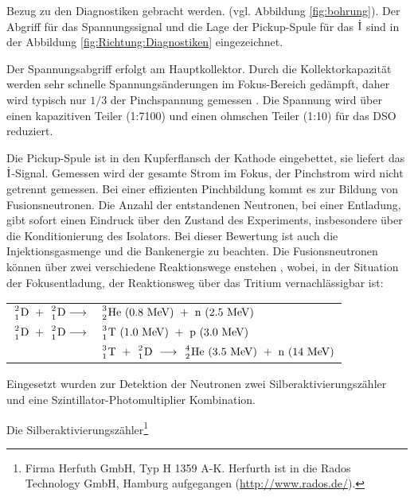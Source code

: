 Bezug zu den Diagnostiken gebracht werden. (vgl. Abbildung
\vref{fig:bohrung}).
%
%
Der Abgriff für das Spannungssignal und die Lage der Pickup-Spule für
das $\rm\dot{I}$ sind in der Abbildung \vref{fig:Richtung:Diagnostiken}
eingezeichnet.
\par
Der Spannungsabgriff erfolgt am Hauptkollektor. Durch die
Kollektorkapazität werden sehr schnelle Spannungsänderungen im
Fokus-Bereich gedämpft, daher wird typisch nur $1/3$ der Pinchspannung
gemessen \cite{stein:staat}. Die Spannung wird über einen kapazitiven
Teiler (1:7100) und einen ohmschen Teiler (1:10) für das DSO reduziert.
\par
Die Pickup-Spule ist in den Kupferflansch der Kathode eingebettet, sie
liefert das $\rm\dot{I}$-Signal. Gemessen wird der gesamte Strom im
Fokus, der Pinchstrom wird nicht getrennt gemessen.
%
\label{sec:neutronendiagnostik}
%
Bei einer effizienten Pinchbildung kommt es zur Bildung von
Fusionsneutronen. Die Anzahl der entstandenen Neutronen, bei einer
Entladung, gibt sofort einen Eindruck über den Zustand des Experiments,
insbesondere über die Konditionierung des Isolators. Bei dieser
Bewertung ist auch die Injektionsgasmenge und die Bankenergie zu
beachten. Die Fusionsneutronen können über zwei verschiedene
Reaktionswege enstehen \cite{dtv:70}, wobei, in der Situation der
Fokusentladung, der Reaktionsweg über das Tritium vernachlässigbar ist:
\par
\begin{tabular}{rl}
  ${2 \atop 1}{\rm D} \ +\ {2 \atop 1}{\rm D} \longrightarrow
  $&${3 \atop 2}{\rm He}\ (0.8 {\rm\ MeV}) \ +\ \rm n\ (2.5 {\rm\ MeV}) $\\[1.5mm]

  ${2 \atop 1}{\rm D} \ +\ {2 \atop 1}{\rm D} \longrightarrow
  $&${3 \atop 1}{\rm T}\ (1.0 {\rm\ MeV}) \ +\ \rm p\ (3.0 {\rm\ MeV}) $\\[1.5mm]

  &${3 \atop 1}{\rm T} \ +\ {2 \atop 1}{\rm D} \ \longrightarrow \
  {4 \atop 2}{\rm He}\ (3.5 {\rm\ MeV}) \ +\ \rm n\ (14 {\rm\ MeV}) $\\[1.5mm]
\end{tabular}
\par
Eingesetzt wurden zur Detektion der Neutronen zwei Silberaktivierungszähler und
eine Szintillator-Photomultiplier Kombination.
\par
Die Silberaktivierungszähler\footnote{Firma Herfuth GmbH,
    Typ H 1359 A-K.
    Herfurth ist in die Rados Technology GmbH, Hamburg aufgegangen
    (\url{http://www.rados.de/}).}
